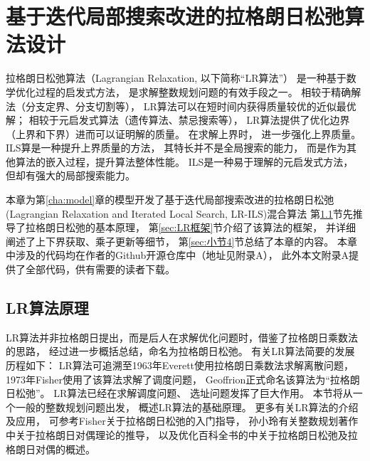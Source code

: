 \setlength{\baselineskip}{20pt}
\chapter{基于迭代局部搜索改进的拉格朗日松弛算法设计}
\label{cha:LR算法}
拉格朗日松弛算法（Lagrangian Relaxation, 以下简称``LR算法''）
是一种基于数学优化过程的启发式方法，
是求解整数规划问题的有效手段之一。
相较于精确解法（分支定界、分支切割等），
LR算法可以在短时间内获得质量较优的近似最优解；
相较于元启发式算法（遗传算法、禁忌搜索等），
LR算法提供了优化边界（上界和下界）进而可以证明解的质量。
在求解上界时，
进一步强化上界质量。
ILS算是一种提升上界质量的方法，
其特长并不是全局搜索的能力，
而是作为其他算法的嵌入过程，提升算法整体性能。
ILS是一种易于理解的元启发式方法，
但却有强大的局部搜索能力\cite{ils}。

本章为第\ref{cha:model}章的模型开发了基于迭代局部搜索改进的拉格朗日松弛
(Lagrangian Relaxation and Iterated Local Search, LR-ILS)混合算法
第\ref{sec:LR概述}节先推导了拉格朗日松弛的基本原理，
第\ref{sec:LR框架}节介绍了该算法的框架，
并详细阐述了上下界获取、乘子更新等细节，
第\ref{sec:小节4}节总结了本章的内容。
本章中涉及的代码均在作者的Github开源仓库中（地址见附录A），
此外本文附录A提供了全部代码，供有需要的读者下载。

\section{LR算法原理}
\label{sec:LR概述}

LR算法并非拉格朗日提出，而是后人在求解优化问题时，借鉴了拉格朗日乘数法的思路，
经过进一步概括总结，命名为拉格朗日松弛。
有关LR算法简要的发展历程如下：
LR算法可追溯至1963年Everett\cite{Everett}使用拉格朗日乘数法求解离散问题，
1973年Fisher\cite{Fisher1973}使用了该算法求解了调度问题，
Geoffrion\cite{Geoffrion1974}正式命名该算法为``拉格朗日松弛''。
LR算法已经在求解调度问题\cite{温旭红}、
选址问题\cite{yun2015}发挥了巨大作用。
本节将从一个一般的整数规划问题出发，
概述LR算法的基础原理。
更多有关LR算法的介绍及应用，
可参考Fisher\cite{Fisher2004}关于拉格朗日松弛的入门指导，
孙小玲\cite{孙小玲}有关整数规划著作中关于拉格朗日对偶理论的推导，
以及优化百科全书\cite{Hearn2009}的中关于拉格朗日松弛及拉格朗日对偶的概述。

